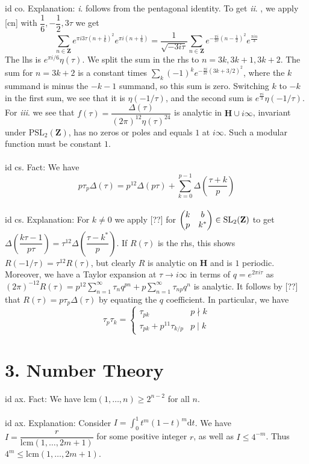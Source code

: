 \documentclass[oneside]{book}
\newcommand{\Z}{\mathbf{Z}}
\newcommand{\PSL}{\mathrm{PSL}}
\newcommand{\fit}[1]{\left( #1\right)}
\renewcommand{\d}{\mathrm{d}}
\newcommand{\lcm}{\mathrm{lcm}}
\renewcommand{\i}{{\it i}. }
\newcommand{\ii}{{\it ii}. }
\newcommand{\iii}{{\it iii}. }
\renewcommand{\H}{\mathbf{H}}
\newcommand*\pmat[4]{\begin{pmatrix}#1&#2\\#3&#4\end{pmatrix}}
\newcommand\chap[1]{%
  \chapter*{#1}%
  \addcontentsline{toc}{chapter}{#1}}
\begin{document}
id co. Explanation: \i follows from the pentagonal identity. To get \ii, we apply [cn] with $\dfrac{1}{6},-\dfrac{1}{2},3\tau$ we get
$$\sum_{n\in\Z}e^{\pi i 3\tau (n+\frac{1}{6})^2}e^{\pi i (n+\frac{1}{6})}=\dfrac{1}{\sqrt{-3i\tau}}\sum_{n\in\Z}e^{-\frac{\pi i}{3\tau} (n-\frac{1}{2})^2}e^{\frac{\pi i n}{3}}$$
The lhs is $e^{\pi i/6}\eta(\tau)$. We split the sum in the rhs to $n=3k,3k+1,3k+2$. The sum for $n=3k+2$ is a constant times $\sum_k (-1)^k e^{-\frac{\pi i}{3\tau}(3k+3/2)^2}$, where the $k$ summand is minus the $-k-1$ summand, so this sum is zero. Switching $k$ to $-k$ in the first sum, we see that it is $\eta(-1/\tau)$, and the second sum is $e^{\frac{\pi i}{3}}\eta(-1/\tau)$. For \iii we see that $f(\tau)=\dfrac{\Delta(\tau)}{(2\pi)^{12}\eta(\tau)^{24}}$ is analytic in $\H\cup{i\infty}$, invariant under $\PSL_2(\Z)$, has no zeros or poles and equals $1$ at $i\infty$. Such a modular function must be constant $1$.\\\\


id cs. Fact: We have $$p\tau_p\Delta(\tau) = p^{12}\Delta(p\tau) + \sum_{k=0}^{p-1} \Delta\fit{\dfrac{\tau + k}{p}}$$\\


id cs. Explanation: For $k\neq 0$ we apply [??] for $\pmat{k}{b}{p}{k^*}\in\SL_2(\Z)$ to get $\Delta\fit{\dfrac{k\tau -1}{p\tau}}=\tau^{12}\Delta\fit{\dfrac{\tau-k^*}{p}}$. If $R(\tau)$ is the rhs, this shows $R(-1/\tau)=\tau^{12}R(\tau)$, but clearly $R$ is analytic on $\H$ and is $1$ periodic. Moreover, we have a Taylor expansion at $\tau\to i\infty$ in terms of $q=e^{2\pi i\tau}$ as $(2\pi)^{-12}R(\tau)=p^{12}\sum_{n=1}^{\infty} \tau_n q^{pn}+p\sum_{n=1}^\infty \tau_{np}q^n $ is analytic. It follows by [??] that $R(\tau)=p\tau_p\Delta(\tau)$ by equating the $q$ coefficient. In particular, we have $$\tau_p\tau_k = \begin{cases}
    \tau_{pk} & p\nmid k\\
    \tau_{pk}+p^{11}\tau_{k/p} & p\mid k
\end{cases}$$






\newpage
\chap{3. Number Theory}
id ax. Fact: We have $\lcm(1,\dots,n)\ge 2^{n-2}$ for all $n$.    \\\\


id ax. Explanation: Consider $I=\int_0^1 t^m(1-t)^m\d t$. We have $I=\dfrac{r}{\lcm(1,\dots,2m+1)}$ for some positive integer $r$, as well as $I\le 4^{-m}$. Thus $4^{m}\le \lcm(1,\dots,2m+1)$.
\end{document}
